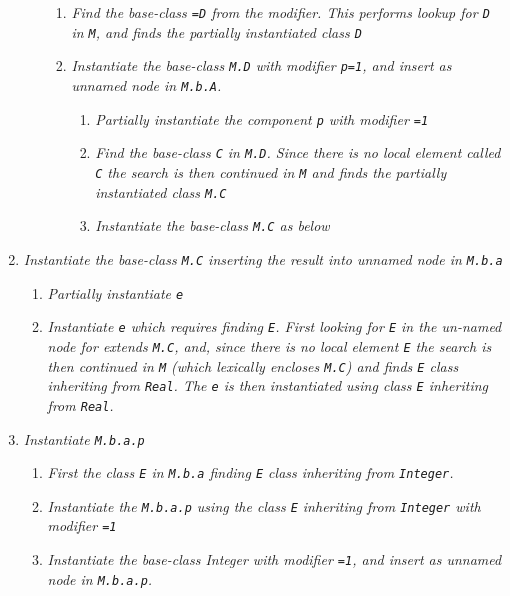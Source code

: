 \begin{example}
\begin{enumerate}
\begin{enumerate}
    \begin{enumerate}
    \item
      \emph{Find the base-class \lstinline!=D! from the modifier. This performs
      lookup for \lstinline!D! in \lstinline!M!, and finds the partially instantiated class \lstinline!D!}
    \item
      \emph{Instantiate the base-class \lstinline!M.D! with modifier \lstinline!p=1!, and insert
      as unnamed node in \lstinline!M.b.A!.}

      \begin{enumerate}
      \item
        \emph{Partially instantiate the component \lstinline!p! with modifier \lstinline!=1!}
      \item
        \emph{Find the base-class \lstinline!C! in \lstinline!M.D!. Since there is no local
        element called \lstinline!C! the search is then continued in \lstinline!M! and finds
        the partially instantiated class \lstinline!M.C!}
      \item
        \emph{Instantiate the base-class \lstinline!M.C! as below}
      \end{enumerate}
    \end{enumerate}
  \end{enumerate}
\item
  \emph{Instantiate the base-class \lstinline!M.C! inserting the result into unnamed
  node in \lstinline!M.b.a!}

  \begin{enumerate}
  \item
    \emph{Partially instantiate \lstinline!e!}
  \item
    \emph{Instantiate \lstinline!e! which requires finding \lstinline!E!. First looking for
    \lstinline!E! in the un-named node for extends \lstinline!M.C!, and, since there is no
    local element \lstinline!E! the search is then continued in \lstinline!M! (which
    lexically encloses \lstinline!M.C!) and finds \lstinline!E! class inheriting from \lstinline!Real!.
    The \lstinline!e! is then instantiated using class \lstinline!E! inheriting from
    \lstinline!Real!.}
  \end{enumerate}
\item
  \emph{Instantiate \lstinline!M.b.a.p!}

  \begin{enumerate}
  \item
    \emph{First the class \lstinline!E! in \lstinline!M.b.a! finding \lstinline!E! class inheriting from
    \lstinline!Integer!.}
  \item
    \emph{Instantiate the \lstinline!M.b.a.p! using the class \lstinline!E! inheriting from
    \lstinline!Integer! with modifier \lstinline!=1!}
  \item
    \emph{Instantiate the base-class Integer with modifier \lstinline!=1!, and
    insert as unnamed node in \lstinline!M.b.a.p!.}
  \end{enumerate}
\end{enumerate}


\end{example}
